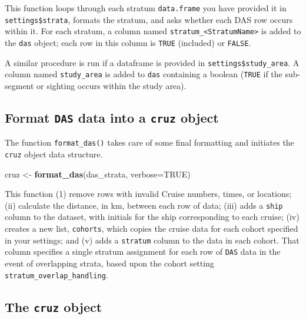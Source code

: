 \documentclass[
]{book}
\newenvironment{Shaded}{\begin{snugshade}}{\end{snugshade}}
\newcommand{\DataTypeTok}[1]{\textcolor[rgb]{0.13,0.29,0.53}{#1}}
\newcommand{\KeywordTok}[1]{\textcolor[rgb]{0.13,0.29,0.53}{\textbf{#1}}}
\newcommand{\NormalTok}[1]{#1}
\newcommand{\OtherTok}[1]{\textcolor[rgb]{0.56,0.35,0.01}{#1}}
\newcommand{\StringTok}[1]{\textcolor[rgb]{0.31,0.60,0.02}{#1}}
\begin{document}
This function loops through each stratum \texttt{data.frame} you have provided it in \texttt{settings\$strata}, formats the stratum, and asks whether each DAS row occurs within it. For each stratum, a column named \texttt{stratum\_\textless{}StratumName\textgreater{}} is added to the \texttt{das} object; each row in this column is \texttt{TRUE} (included) or \texttt{FALSE}.

A similar procedure is run if a dataframe is provided in \texttt{settings\$study\_area}. A column named \texttt{study\_area} is added to \texttt{das} containing a boolean (\texttt{TRUE} if the sub-segment or sighting occurs within the study area).

\hypertarget{format-das-data-into-a-cruz-object}{%
\subsection*{\texorpdfstring{Format \texttt{DAS} data into a \texttt{cruz} object}{Format DAS data into a cruz object}}\label{format-das-data-into-a-cruz-object}}

The function \texttt{format\_das()} takes care of some final formatting and initiates the \texttt{cruz} object data structure.

\begin{Shaded}
\begin{Highlighting}[]
\NormalTok{cruz <-}\StringTok{ }\KeywordTok{format_das}\NormalTok{(das_strata, }\DataTypeTok{verbose=}\OtherTok{TRUE}\NormalTok{)}
\end{Highlighting}
\end{Shaded}

This function (1) remove rows with invalid Cruise numbers, times, or locations; (ii) calculate the distance, in km, between each row of data; (iii) adds a \texttt{ship} column to the dataset, with initials for the ship corresponding to each cruise; (iv) creates a new list, \texttt{cohorts}, which copies the cruise data for each cohort specified in your settings; and (v) adds a \texttt{stratum} column to the data in each cohort. That column specifies
a single stratum assignment for each row of \texttt{DAS} data in the event of overlapping strata, based upon the cohort setting \texttt{stratum\_overlap\_handling}.

\hypertarget{the-cruz-object}{%
\subsection*{\texorpdfstring{The \texttt{cruz} object}{The cruz object}}\label{the-cruz-object}}
\end{document}
